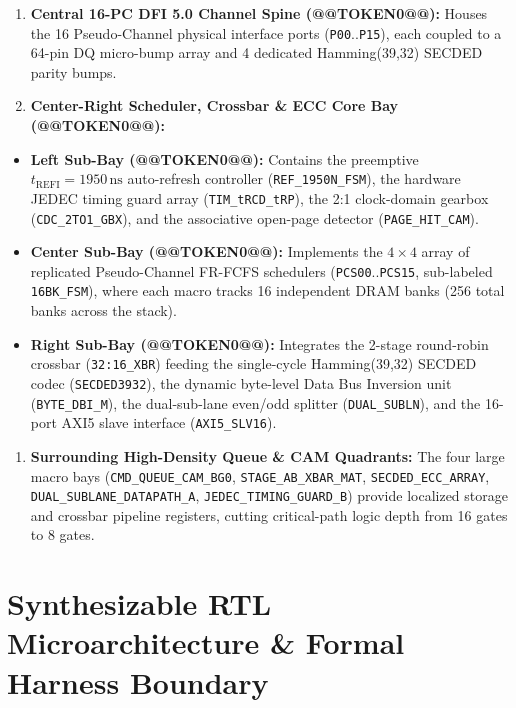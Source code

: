 \documentclass[journal,10pt,twocolumn]{IEEEtran}
\begin{document}
\begin{enumerate}
  \item \textbf{Central 16-PC DFI 5.0 Channel Spine (@@TOKEN0@@):} Houses the 16 Pseudo-Channel physical interface ports (\texttt{P00}..\texttt{P15}), each coupled to a 64-pin DQ micro-bump array and 4 dedicated Hamming(39,32) SECDED parity bumps.
  \item \textbf{Center-Right Scheduler, Crossbar \& ECC Core Bay (@@TOKEN0@@):}
\end{enumerate}
\begin{itemize}
  \item \textbf{Left Sub-Bay (@@TOKEN0@@):} Contains the preemptive $t_{\mathrm{REFI}}=1950\,\mathrm{ns}$ auto-refresh controller (\texttt{REF\_1950N\_FSM}), the hardware JEDEC timing guard array (\texttt{TIM\_tRCD\_tRP}), the 2:1 clock-domain gearbox (\texttt{CDC\_2TO1\_GBX}), and the associative open-page detector (\texttt{PAGE\_HIT\_CAM}).
  \item \textbf{Center Sub-Bay (@@TOKEN0@@):} Implements the $4 \times 4$ array of replicated Pseudo-Channel FR-FCFS schedulers (\texttt{PCS00}..\texttt{PCS15}, sub-labeled \texttt{16BK\_FSM}), where each macro tracks 16 independent DRAM banks (256 total banks across the stack).
  \item \textbf{Right Sub-Bay (@@TOKEN0@@):} Integrates the 2-stage round-robin crossbar (\texttt{32:16\_XBR}) feeding the single-cycle Hamming(39,32) SECDED codec (\texttt{SECDED3932}), the dynamic byte-level Data Bus Inversion unit (\texttt{BYTE\_DBI\_M}), the dual-sub-lane even/odd splitter (\texttt{DUAL\_SUBLN}), and the 16-port AXI5 slave interface (\texttt{AXI5\_SLV16}).
\end{itemize}
\begin{enumerate}
  \item \textbf{Surrounding High-Density Queue \& CAM Quadrants:} The four large macro bays (\texttt{CMD\_QUEUE\_CAM\_BG0}, \texttt{STAGE\_AB\_XBAR\_MAT}, \texttt{SECDED\_ECC\_ARRAY}, \texttt{DUAL\_SUBLANE\_DATAPATH\_A}, \texttt{JEDEC\_TIMING\_GUARD\_B}) provide localized storage and crossbar pipeline registers, cutting critical-path logic depth from 16 gates to 8 gates.
\end{enumerate}


\section{Synthesizable RTL Microarchitecture \& Formal Harness Boundary}
\end{document}
